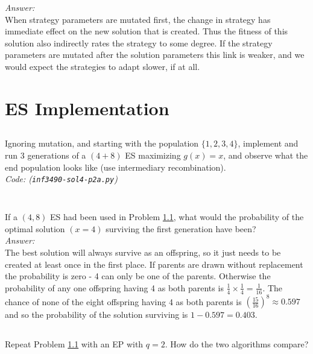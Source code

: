 \documentclass{article}           %
\newcommand\marginsymbol[1][0pt]{%
  \tabto*{0cm}\makebox[\dimexpr-1cm-#1\relax][r]{$\mathbb{P}$}\tabto*{\TabPrevPos}}
\begin{document}
\textit{Answer:}\\

When strategy parameters are mutated first, the change in strategy has immediate effect on the new solution that is created.
Thus the fitness of this solution also indirectly rates the strategy to some degree.
If the strategy parameters are mutated after the solution parameters this link is weaker, and we would expect the strategies to adapt slower, if at all.

\section{ES Implementation} %
\subsection{\marginsymbol} %
\label{subsec:w4e3a}
Ignoring mutation, and starting with the population \(\{1, 2, 3, 4\}\), implement and run 3 generations of a \((4 + 8)\) ES maximizing \(g(x) = x\), and observe what the end population looks like (use intermediary recombination).\\

\textit{Code: (\texttt{inf3490-sol4-p2a.py})}\\
\inputminted{Python}{inf3490-sol4-p2a.py}

\subsection{} %
If a \((4, 8)\) ES had been used in Problem \ref{subsec:w4e3a},
what would the probability of the optimal solution \((x = 4)\) surviving the first generation have been?\\

\textit{Answer:}\\

The best solution will always survive as an offspring, so it just needs to be created
at least once in the first place. If parents are drawn without replacement the
probability is zero - 4 can only be one of the parents. Otherwise the probability of
any one offspring having 4 as both parents is
\( \frac{1}{4} \times \frac{1}{4} = \frac{1}{16} \).
The chance of none of the eight offspring having 4 as both parents is
\( (\frac{15}{16})^8 \approx 0.597 \)
and so the probability of the solution surviving is
\(1 - 0.597 = 0.403\).


\subsection{\marginsymbol} %
Repeat Problem \ref{subsec:w4e3a} with an EP with \(q = 2\).
How do the two algorithms compare?\\
\end{document}
